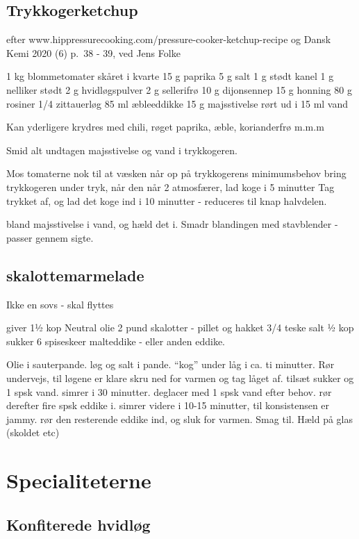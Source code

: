 \documentclass[
]{book}
\begin{document}
\section{Trykkogerketchup}\label{trykkogerketchup}

efter www.hippressurecooking.com/pressure-cooker-ketchup-recipe
og Dansk Kemi 2020 (6) p.~38 - 39, ved Jens Folke

1 kg blommetomater skåret i kvarte
15 g paprika
5 g salt
1 g stødt kanel
1 g nelliker stødt
2 g hvidløgspulver
2 g sellerifrø
10 g dijonsennep
15 g honning
80 g rosiner
1/4 zittauerløg
85 ml æbleeddikke
15 g majsstivelse rørt ud i 15 ml vand

Kan yderligere krydres med chili, røget paprika, æble, korianderfrø
m.m.m

Smid alt undtagen majsstivelse og vand i trykkogeren.

Mos tomaterne nok til at væsken når op på trykkogerens minimumsbehov
bring trykkogeren under tryk, når den når 2 atmosfærer, lad koge i
5 minutter
Tag trykket af, og lad det koge ind i 10 minutter - reduceres til knap
halvdelen.

bland majsstivelse i vand, og hæld det i.
Smadr blandingen med stavblender - passer gennem sigte.

\section{skalottemarmelade}\label{skalottemarmelade}

Ikke en sovs - skal flyttes

giver 1½ kop
Neutral olie
2 pund skalotter - pillet og hakket
3/4 teske salt
½ kop sukker
6 spiseskeer malteddike - eller anden eddike.

Olie i sauterpande.
løg og salt i pande.
``kog'' under låg i ca. ti minutter. Rør undervejs, til løgene er klare
skru ned for varmen og tag låget af.
tilsæt sukker og 1 spsk vand. simrer i 30 minutter. deglacer med 1 spsk vand efter behov.
rør derefter fire spsk eddike i. simrer videre i 10-15 minutter, til konsistensen er jammy.
rør den resterende eddike ind, og sluk for varmen.
Smag til.
Hæld på glas (skoldet etc)

\chapter{Specialiteterne}\label{specialiteterne}

\section{Konfiterede hvidløg}\label{konfiterede-hvidluxf8g}
\end{document}

